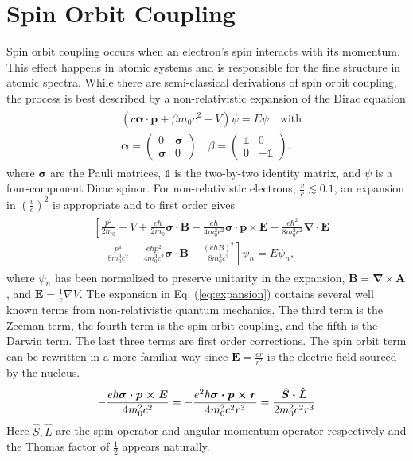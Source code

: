 \documentclass[12pt]{article}
\newcommand{\newln}{\\&{}}
\begin{document}
\section{Spin Orbit Coupling}
Spin orbit coupling occurs when an electron's spin interacts with its momentum.
This effect happens in atomic systems and is responsible for the fine structure in atomic spectra.
While there are semi-classical derivations of spin orbit coupling, the process is best described by a non-relativistic expansion of the Dirac equation \cite{Dirac, Winkler}
\begin{align}\begin{split}
  \label{eq:Dirac}
  & (c\boldsymbol{\alpha\cdot p}+\beta m_{0}c^2+V)\psi=E\psi \quad\text{with}\newln\boldsymbol{\alpha}=\left(\begin{array}{cc} 0 & \boldsymbol{\sigma} \\ \boldsymbol{\sigma} & 0 \end{array} \right) \quad \beta=\left(\begin{array}{cc} \mathbb{1} & 0 \\ 0 & -\mathbb{1} \end{array} \right)\text{.}
\end{split}\end{align}
where $\boldsymbol\sigma$ are the Pauli matrices, $\mathbb{1}$ is the two-by-two identity matrix, and $\psi$ is a four-component Dirac spinor.
For non-relativistic electrons, $\frac{v}{c}\lesssim 0.1$, an expansion in $(\frac{v}{c})^2$ is appropriate and  to first order gives
\begin{align}\begin{split}
  \label{eq:expansion}
& \left [ \frac{p^2}{2m_0}\right.+V+\frac{e\hbar}{2m_0}\boldsymbol{\sigma\cdot B}-\frac{e\hbar}{4m_0^2c^2}\boldsymbol{\sigma\cdot p \times E}-\frac{e\hbar^2}{8m_0^2c^2}\boldsymbol{\nabla\cdot E} \newln-\frac{p^4}{8m_0^3c^2}-\frac{e\hbar p^2}{4m_0^3c^2}\boldsymbol{\sigma \cdot B}-\left.\frac{(ehB)^2}{8m_0^3c^2}\right]\psi_n=E\psi_n\text{,}
\end{split}\end{align}
where $\psi_n$ has been normalized to preserve unitarity in the expansion, $\boldsymbol{B}=\boldsymbol{\nabla}\times\boldsymbol{A}$, and $\boldsymbol{E}=\frac{1}{e}\nabla V$.
The expansion in Eq. (\ref{eq:expansion}) contains several well known terms from non-relativistic quantum mechanics.
The third term is the Zeeman term, the fourth term is the spin orbit coupling, and the fifth is the Darwin term.
The last three terms are first order corrections.
The spin orbit term can be rewritten in a more familiar way since $\boldsymbol{E}=\frac{e\hat{r}}{r^2}$ is the electric field sourced by the nucleus.
\begin{align}
  \label{eq:soc}
  -\frac{e\hbar\boldsymbol{\sigma\cdot p \times E}}{4m_0^2c^2}=-\frac{e^2\hbar\boldsymbol{\sigma\cdot p \times r}}{4m_0^2c^2r^3}\newline=\frac{\boldsymbol{\hat{S}\cdot \hat{L}}}{2m_0^2c^2r^3}
\end{align}
Here $\hat{S}, \hat{L}$ are the spin operator and angular momentum operator respectively and the Thomas factor of $\frac{1}{2}$ appears naturally.
\end{document}
